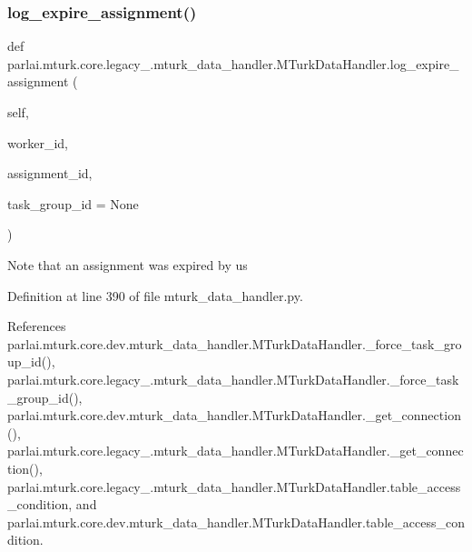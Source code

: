 \subsubsection{\texorpdfstring{log\+\_\+expire\+\_\+assignment()}{log\_expire\_assignment()}}
{\footnotesize\ttfamily def parlai.\+mturk.\+core.\+legacy\+\_.\+mturk\+\_\+data\+\_\+handler.\+M\+Turk\+Data\+Handler.\+log\+\_\+expire\+\_\+assignment (\begin{DoxyParamCaption}\item[{}]{self,  }\item[{}]{worker\+\_\+id,  }\item[{}]{assignment\+\_\+id,  }\item[{}]{task\+\_\+group\+\_\+id = {\ttfamily None} }\end{DoxyParamCaption})}

\begin{DoxyVerb}Note that an assignment was expired by us\end{DoxyVerb}
 

Definition at line 390 of file mturk\+\_\+data\+\_\+handler.\+py.



References parlai.\+mturk.\+core.\+dev.\+mturk\+\_\+data\+\_\+handler.\+M\+Turk\+Data\+Handler.\+\_\+force\+\_\+task\+\_\+group\+\_\+id(), parlai.\+mturk.\+core.\+legacy\+\_.\+mturk\+\_\+data\+\_\+handler.\+M\+Turk\+Data\+Handler.\+\_\+force\+\_\+task\+\_\+group\+\_\+id(), parlai.\+mturk.\+core.\+dev.\+mturk\+\_\+data\+\_\+handler.\+M\+Turk\+Data\+Handler.\+\_\+get\+\_\+connection(), parlai.\+mturk.\+core.\+legacy\+\_.\+mturk\+\_\+data\+\_\+handler.\+M\+Turk\+Data\+Handler.\+\_\+get\+\_\+connection(), parlai.\+mturk.\+core.\+legacy\+\_.\+mturk\+\_\+data\+\_\+handler.\+M\+Turk\+Data\+Handler.\+table\+\_\+access\+\_\+condition, and parlai.\+mturk.\+core.\+dev.\+mturk\+\_\+data\+\_\+handler.\+M\+Turk\+Data\+Handler.\+table\+\_\+access\+\_\+condition.

